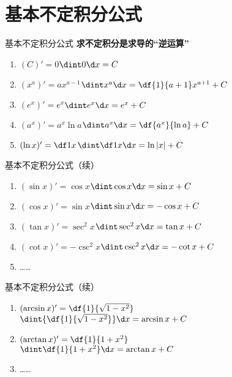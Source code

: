 \section{基本不定积分公式}

\begin{frame}{基本不定积分公式}
	\linespread{1.2}\pause 
	{\bf 求不定积分是求导的“逆运算”}
	\begin{enumerate}\pause 
	  \item $(C)'=0$\hfill \pause \alert{$\dint 0\d x=C$}\pause 
	  \item $(x^a)'=ax^{a-1}$\hfill \pause \alert{$\dint
	  x^a\d x=\df{1}{a+1}x^{a+1}+C$}\pause
	  \item $(e^x)'=e^x$\hfill \pause \alert{$\dint e^x\d x=e^x+C$}\pause 
	  \item $(a^x)'=a^x\ln a$\hfill \pause \alert{$\dint a^x\d x=\df{a^x}{\ln
	  a}+C$}\pause
	  \item $(\ln x)'=\df 1x$\hfill \pause \alert{$\dint \df 1x\d x=\ln|x|+C$}
	\end{enumerate}
\end{frame}

\begin{frame}{基本不定积分公式\small（续）}
	\linespread{1.2}
	\begin{enumerate}
	  \addtocounter{enumi}{5}\pause 
	  \item $(\sin x)'=\cos x$\hfill \pause \alert{$\dint \cos x\d x=\sin x+C$}\pause 
	  \item $(\cos x)'=\sin x$\hfill \pause \alert{$\dint \sin x\d x=-\cos
	  x+C$}\pause
	  \item $(\tan x)'=\sec^2 x$\hfill \pause \alert{$\dint \sec^2 x\d x=\tan
	  x+C$}\pause 
	  \item $(\cot x)'=-\csc^2 x$\hfill \pause \alert{$\dint \csc^2 x\d x=-\cot
	  x+C$}\pause
	  \item \ldots\ldots
	\end{enumerate}
\end{frame}

\begin{frame}{基本不定积分公式\small（续）}
	\linespread{1.2}
	\begin{enumerate}
	  \addtocounter{enumi}{10}
	  \item $(\arcsin
	  x)'=\df{1}{\sqrt{1-x^2}}$\\ \hfill \pause 
	  \alert{$\dint{\df{1}{\sqrt{1-x^2}}}\d x=\arcsin x+C$}\pause 
	  \item $(\arctan x)'=\df{1}{1+x^2}$\\ \hfill\pause 
	  \alert{$\dint \df{1}{1+x^2}\d x=\arctan x+C$}\pause 
	  \item \ldots \ldots
	\end{enumerate}
\end{frame}

